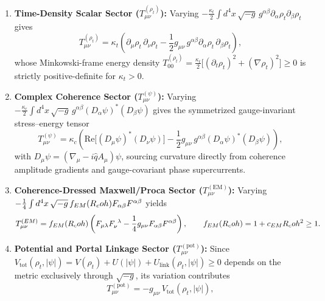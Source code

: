 \begin{enumerate}[leftmargin=2em]
  \item \textbf{Time-Density Scalar Sector ($T_{\mu\nu}^{(\rho_t)}$):} Varying $-\frac{\kappa_t}{2}\int d^4x\,\sqrt{-g}\,g^{\alpha\beta}\partial_\alpha\rho_t\partial_\beta\rho_t$ gives
  \begin{equation}
  T_{\mu\nu}^{(\rho_t)}
  = \kappa_t\left(\partial_\mu\rho_t\,\partial_\nu\rho_t - \frac{1}{2}g_{\mu\nu}\,g^{\alpha\beta}\partial_\alpha\rho_t\,\partial_\beta\rho_t\right),
  \label{eq:T_rhot_sec4}
  \end{equation}
  whose Minkowski-frame energy density $T_{00}^{(\rho_t)} = \frac{\kappa_t}{2}\bigl[(\partial_t\rho_t)^2 + (\nabla\rho_t)^2\bigr] \ge 0$ is strictly positive-definite for $\kappa_t > 0$.
  \item \textbf{Complex Coherence Sector ($T_{\mu\nu}^{(\psi)}$):} Varying $-\frac{\kappa_c}{2}\int d^4x\,\sqrt{-g}\,g^{\alpha\beta}(D_\alpha\psi)^*(D_\beta\psi)$ gives the symmetrized gauge-invariant stress--energy tensor
  \begin{equation}
  T_{\mu\nu}^{(\psi)}
  = \kappa_c\left(\mathrm{Re}\bigl[(D_\mu\psi)^*(D_\nu\psi)\bigr] - \frac{1}{2}g_{\mu\nu}\,g^{\alpha\beta}(D_\alpha\psi)^*(D_\beta\psi)\right),
  \label{eq:T_psi_sec4}
  \end{equation}
  with $D_\mu\psi = (\nabla_\mu - i\hat{q}A_\mu)\psi$, sourcing curvature directly from coherence amplitude gradients and gauge-covariant phase supercurrents.
  \item \textbf{Coherence-Dressed Maxwell/Proca Sector ($T_{\mu\nu}^{(\mathrm{EM})}$):} Varying $-\frac{1}{4}\int d^4x\,\sqrt{-g}\,f_{EM}(R_coh)F_{\alpha\beta}F^{\alpha\beta}$ yields
  \begin{equation}
  T_{\mu\nu}^{(EM)}
  = f_{EM}(R_coh)\left(F_{\mu\lambda}F_\nu^{\ \lambda} - \frac{1}{4}g_{\mu\nu}F_{\alpha\beta}F^{\alpha\beta}\right),
  \qquad
  f_{EM}(R_coh) = 1 + c_{EM}R_coh^2 \ge 1.
  \label{eq:T_EM_sec4}
  \end{equation}
  \item \textbf{Potential and Portal Linkage Sector ($T_{\mu\nu}^{(\mathrm{pot})}$):} Since $V_{\mathrm{tot}}(\rho_t, |\psi|) = V(\rho_t) + U(|\psi|) + U_{\mathrm{link}}(\rho_t,|\psi|) \ge 0$ depends on the metric exclusively through $\sqrt{-g}$, its variation contributes
  \begin{equation}
  T_{\mu\nu}^{(\mathrm{pot})} = -g_{\mu\nu}\,V_{\mathrm{tot}}(\rho_t, |\psi|),
  \label{eq:T_pot_sec4}
  \end{equation}

\end{enumerate}
